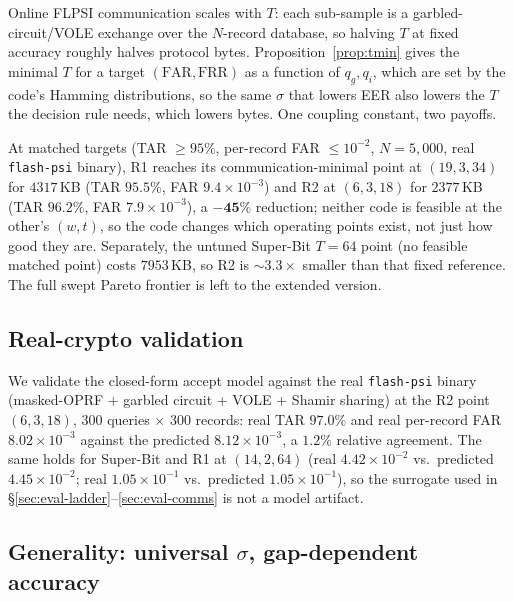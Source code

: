 Online FLPSI communication scales with $T$: each sub-sample is a garbled-circuit/VOLE exchange over
the $N$-record database, so halving $T$ at fixed accuracy roughly halves protocol bytes.
Proposition~\ref{prop:tmin} gives the minimal $T$ for a target $(\mathrm{FAR},\mathrm{FRR})$ as a
function of $q_g, q_i$, which are set by the code's Hamming distributions, so the same $\sigma$ that
lowers EER also lowers the $T$ the decision rule needs, which lowers bytes. One coupling constant, two
payoffs.

At matched targets (TAR $\geq95\%$, per-record FAR $\leq10^{-2}$, $N=5{,}000$, real \texttt{flash-psi}
binary), R1 reaches its communication-minimal point at $(19,3,34)$ for $4317$\,KB (TAR $95.5\%$, FAR
$9.4\times10^{-3}$) and R2 at $(6,3,18)$ for $2377$\,KB (TAR $96.2\%$, FAR $7.9\times10^{-3}$), a
$\mathbf{-45\%}$ reduction; neither code is feasible at the other's $(w,t)$, so the code changes which
operating points exist, not just how good they are. Separately, the untuned Super-Bit $T=64$ point
(no feasible matched point) costs $7953$\,KB, so R2 is $\sim3.3\times$ smaller than that fixed
reference. The full swept Pareto frontier is left to the extended version.

\subsection{Real-crypto validation}

We validate the closed-form accept model against the real \texttt{flash-psi} binary (masked-OPRF +
garbled circuit + VOLE + Shamir sharing) at the R2 point $(6,3,18)$, 300 queries $\times$ 300 records:
real TAR $97.0\%$ and real per-record FAR $8.02\times10^{-3}$ against the predicted $8.12\times10^{-3}$,
a $1.2\%$ relative agreement. The same holds for Super-Bit and R1 at $(14,2,64)$ (real $4.42\times
10^{-2}$ vs.\ predicted $4.45\times10^{-2}$; real $1.05\times10^{-1}$ vs.\ predicted $1.05\times10^{-1}$),
so the surrogate used in \S\ref{sec:eval-ladder}--\ref{sec:eval-comms} is not a model artifact.

\subsection{Generality: universal $\sigma$, gap-dependent accuracy}

